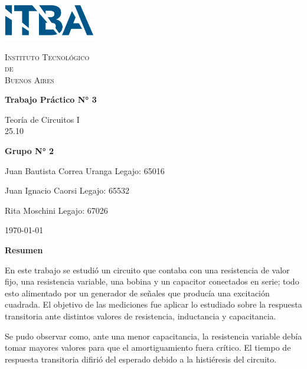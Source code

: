\documentclass{article}
\newcommand{\Facultad}{Instituto Tecnológico \\de\\ Buenos Aires} %
\newcommand{\TPn}{Trabajo Práctico N° 3}
\begin{document}
\begin{titlepage} %

        \begin{flushleft}
            \centering
            \includegraphics[width=0.3\textwidth]{Logo_ITBA.png}
        \end{flushleft}

        \centering
            
        {\scshape\LARGE \Facultad \par} %
        \vspace{1cm}                    %


        {\huge\bfseries \TPn \par}
        \vspace{1.5cm}
        {\Large Teoría de Circuitos I\\ 25.10 \par}
        \vfill                      %
        {\Large \bfseries Grupo N° 2 \par}
        \vspace{1cm}
        {\large Juan Bautista Correa Uranga \hfill Legajo: 65016 \par} %
        {\large Juan Ignacio Caorsi \hfill Legajo: 65532  \par}
        {\large Rita Moschini \hfill Legajo: 67026 \par} 
        \vfill
        {\large \today\par}
        \vfil

    \end{titlepage}

{\centering \LARGE \bfseries Resumen \par}

En este trabajo se estudió un circuito que contaba con una resistencia de valor fijo, una resistencia variable, una bobina y un capacitor conectados en serie; todo esto alimentado por un generador de señales que producía una excitación cuadrada. El objetivo de las mediciones fue aplicar lo estudiado sobre la respuesta transitoria ante distintos valores de resistencia, inductancia y capacitancia. \par
Se pudo observar como, ante una menor capacitancia, la resistencia variable debía tomar mayores valores para que el amortiguamiento fuera crítico. El tiempo de respuesta transitoria difirió del esperado debido a la histiéresis del circuito.
\end{document}
